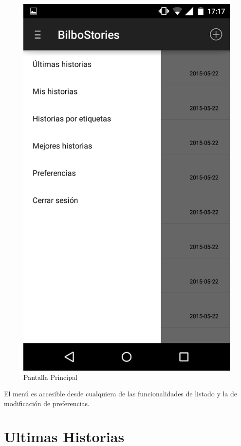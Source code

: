 \documentclass[11pt,a4paper, titlepage]{article}
\begin{document}
	\begin{figure}[hbtp]
		\centering
		\includegraphics[scale = 0.25 ]{img/3}
		\caption{Pantalla Principal}
		\label{p1}
	\end{figure}
	
	El menú es accesible desde cualquiera de las funcionalidades de listado y la de modificación de preferencias.
	
	\section[Ultimas Historias]{Ultimas Historias}
	
\end{document}
